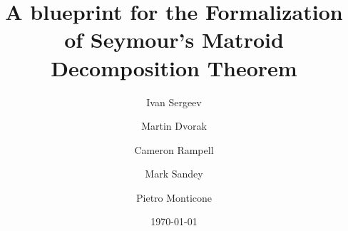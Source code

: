 
\title{A blueprint for the Formalization of Seymour's Matroid Decomposition Theorem}

\author[Sergeev et al.]{Ivan Sergeev}
\address{Ivan Sergeev, Institute of Science and Technology Austria}

\author[]{Martin Dvorak}
\address{Martin Dvorak, Institute of Science and Technology Austria}

\author[]{Cameron Rampell}
\address{Cameron Rampell}

\author[]{Mark Sandey}
\address{Mark Sandey}

\author[]{Pietro Monticone}
\address{Pietro Monticone, University of Trento}

\date{\today}

\usepackage{amsmath} %
\usepackage{amssymb} %
\usepackage{amsthm} %
\usepackage[unicode,colorlinks=true,linkcolor=blue,urlcolor=magenta,citecolor=blue]{hyperref}  %
\usepackage{tikz}  %
\newtheorem{theorem}{Theorem}
\theoremstyle{definition}
\newtheorem{definition}[theorem]{Definition}
\newtheorem{lemma}[theorem]{Lemma}
\newtheorem{corollary}[theorem]{Corollary}


\newcommand{\SeeLean}{See implementation in Lean.}
